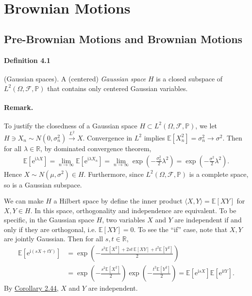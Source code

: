 \documentclass{article}
\numberwithin{equation}{section}
\newcommand{\e}{\mathrm{e}}
\newcommand{\E}{\mathbb{E}}
\renewcommand{\P}{\mathbb{P}}
\renewcommand{\i}{\mathrm{i}}
\theoremstyle{plain}
\theoremstyle{definition}
\begin{document}
\newpage
\section{Brownian Motions}
\subsection{Pre-Brownian Motions and Brownian Motions}
\paragraph{Definition 4.1\label{def:4.1}} (Gaussian spaces). A (centered) \textit{Gaussian space} $H$ is a closed subspace of $L^2(\Omega,\mathscr{F},\P)$ that contains only centered Gaussian variables.
\paragraph{Remark.} To justify the closedness of a Gaussian space $H\subset L^2(\Omega,\mathscr{F},\P)$, we let $H\ni X_n\sim N(0,\sigma_n^2)\overset{L^2}{\to} X$. Convergence in $L^2$ implies $\E[X_n^2]=\sigma^2_n\to\sigma^2$. Then for all $\lambda\in\mathbb{R}$, by dominated convergence theorem,
\begin{align*}
	\E\left[\e^{\i\lambda X}\right] = \lim_{n\to\infty}\E\left[\e^{\i\lambda X_n}\right] = \lim_{n\to\infty}\exp\left(-\frac{\sigma_n^2}{2}\lambda^2\right)=\exp\left(-\frac{\sigma^2}{2}\lambda^2\right).
\end{align*}
Hence $X\sim N(\mu,\sigma^2)\in H$. Furthermore, since $L^2(\Omega,\mathscr{F},\P)$ is a complete space, so is a Gaussian subspace.

We can make $H$ a Hilbert space by define the inner product $\langle X,Y\rangle = \E[XY]$ for $X,Y\in H$. In this space, orthogonality and independence are equivalent. To be specific, in the Gaussian space $H$, two variables $X$ and $Y$ are independent if and only if they are orthogonal, i.e. $\E[XY]=0$. To see the ``if'' case, note that $X,Y$ are jointly Gaussian. Then for all $s,t\in\mathbb{R}$,
\begin{align*}
	\E\left[\e^{\i(sX+tY)}\right] &= \exp\left(-\frac{s^2\E[X^2] + 2st\,\E[XY] + t^2\E[Y^2]}{2}\right)\\
	&= \exp\left(-\frac{s^2\E[X^2]}{2}\right)\exp\left(-\frac{t^2\E[Y^2]}{2}\right) = \E\left[\e^{\i sX}\right]\E\left[\e^{\i tY}\right].
\end{align*}
By \hyperref[cor:2.44]{Corollary 2.44}, $X$ and $Y$ are independent.
\end{document}
